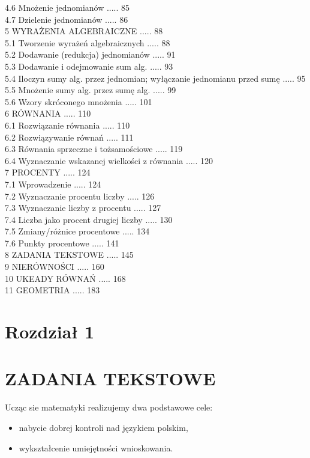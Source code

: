 \documentclass[10pt]{article}
\begin{document}
4.6 Mnożenie jednomianów ..... 85\\
4.7 Dzielenie jednomianów ..... 86\\
5 WYRAŻENIA ALGEBRAICZNE ..... 88\\
5.1 Tworzenie wyrażeń algebraicznych ..... 88\\
5.2 Dodawanie (redukcja) jednomianów ..... 91\\
5.3 Dodawanie i odejmowanie sum alg. ..... 93\\
5.4 Iloczyn sumy alg. przez jednomian; wyłączanie jednomianu przed sumę ..... 95\\
5.5 Mnożenie sumy alg. przez sumę alg. ..... 99\\
5.6 Wzory skróconego mnożenia ..... 101\\
6 RÓWNANIA ..... 110\\
6.1 Rozwiązanie równania ..... 110\\
6.2 Rozwiązywanie równań ..... 111\\
6.3 Równania sprzeczne i tożsamościowe ..... 119\\
6.4 Wyznaczanie wskazanej wielkości z równania ..... 120\\
7 PROCENTY ..... 124\\
7.1 Wprowadzenie ..... 124\\
7.2 Wyznaczanie procentu liczby ..... 126\\
7.3 Wyznaczanie liczby z procentu ..... 127\\
7.4 Liczba jako procent drugiej liczby ..... 130\\
7.5 Zmiany/różnice procentowe ..... 134\\
7.6 Punkty procentowe ..... 141\\
8 ZADANIA TEKSTOWE ..... 145\\
9 NIERÓWNOŚCI ..... 160\\
10 UKEADY RÓWNAŃ ..... 168\\
11 GEOMETRIA ..... 183

\section*{Rozdział 1}
\section*{ZADANIA TEKSTOWE}
Ucząc sie matematyki realizujemy dwa podstawowe cele:

\begin{itemize}
  \item nabycie dobrej kontroli nad językiem polskim,
  \item wykształcenie umiejętności wnioskowania.
\end{itemize}
\end{document}
